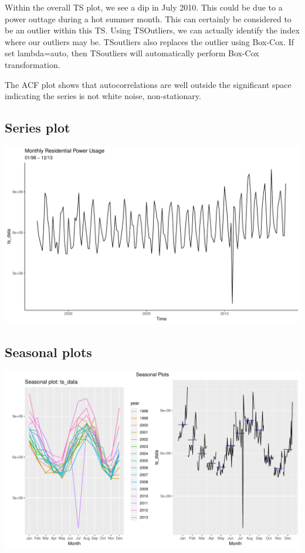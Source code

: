 \documentclass[openany]{book}
\begin{document}
Within the overall TS plot, we see a dip in July 2010. This could be due
to a power outtage during a hot summer month. This can certainly be
considered to be an outlier within this TS. Using TSOutliers, we can
actually identify the index where our outliers may be. TSoutliers also
replaces the outlier using Box-Cox. If set lambda=auto, then TSoutliers
will automatically perform Box-Cox transformation.

The ACF plot shows that autocorrelations are well outside the
significant space indicating the series is not white noise,
non-stationary.

\hypertarget{series-plot}{%
\subsection{Series plot}\label{series-plot}}

\includegraphics{Part-B-AS_files/figure-latex/unnamed-chunk-1-1.pdf}

\hypertarget{seasonal-plots}{%
\subsection{Seasonal plots}\label{seasonal-plots}}

\includegraphics{Part-B-AS_files/figure-latex/unnamed-chunk-2-1.pdf}
\end{document}
